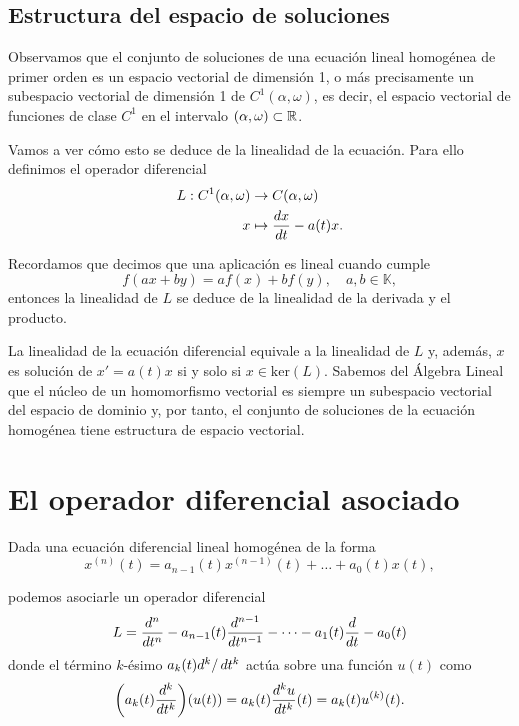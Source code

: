 \documentclass[../ecuaciones_diferenciales.tex]{subfiles}
\begin{document}
\subsection{Estructura del espacio de soluciones}

Observamos que el conjunto de soluciones de una ecuación lineal homogénea de
primer orden es un espacio vectorial de dimensión 1, o más precisamente un
subespacio vectorial de dimensión 1 de \(C^1(\alpha, \omega)\), es decir, el
espacio vectorial de funciones de clase \(C^1\) en el intervalo
\((\alpha, \omega) \subset \mathbb{R}\).

Vamos a ver cómo esto se deduce de la linealidad de la ecuación. Para ello
definimos el operador diferencial
\begin{align*}
	L : C^1(\alpha, \omega) & \to C(\alpha, \omega)              \\
	x                       & \mapsto \frac{d x}{\mathop{d\!} t} - a(t)x.
\end{align*}

Recordamos que decimos que una aplicación es lineal cuando cumple
\[f(ax + by) = af(x) + bf(y), \quad a, b \in \mathbb{K},\] entonces la
linealidad de \(L\) se deduce de la linealidad de la derivada y el producto.
 
\begin{remark}
    La linealidad de la ecuación diferencial equivale a la linealidad de \(L\)
    y, además, \(x\) es solución de \(x' = a(t)x\) si y solo si
    \(x \in \text{ker}(L)\). Sabemos del Álgebra Lineal que el núcleo de un
    homomorfismo vectorial es siempre un subespacio vectorial del espacio de
    dominio y, por tanto, el conjunto de soluciones de la ecuación homogénea
    tiene estructura de espacio vectorial.
\end{remark}

\section{El operador diferencial asociado}

Dada una ecuación diferencial lineal homogénea de la forma
\[x^{(n)}(t) = a_{n-1}(t)x^{(n - 1)}(t) + \dots + a_0(t)x(t),\]

podemos asociarle un operador diferencial
\[L = \frac{d^n}{\mathop{d\!} t^n} - a_{n-1}(t)\frac{d^{n-1}}{\mathop{d\!} t^{n-1}}
	- \dots - a_1(t)\frac{d}{\mathop{d\!} t} - a_0(t)\]
donde el término \(k\)-ésimo \(a_k(t) d^k/\mathop{d\!} t^k\) actúa sobre una
función \(u(t)\) como
\[\left(a_k(t)\frac{d^k}{\dif t^k}\right)(u(t)) = a_k(t) \frac{d^ku}{\dif t^k}(t)
	= a_k(t) u^{(k)}(t).\]
\end{document}
